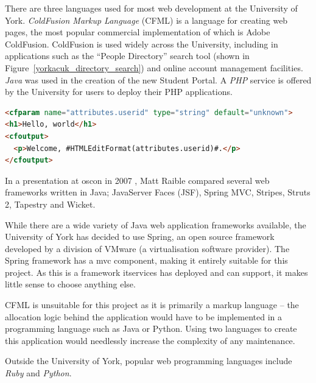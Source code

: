 \documentclass[draft]{scrartcl}
\begin{document}
There are three languages used for most web development at the University of
York. \emph{ColdFusion Markup Language} (CFML) is a language for creating web pages,
the most popular commercial implementation of which is Adobe ColdFusion.
ColdFusion is used widely across the University, including in applications
such as the ``People Directory'' search tool (shown in
Figure~\ref{yorkacuk_directory_search}) and online account management
facilities. \emph{Java} was used in the creation of the new Student Portal. A
\emph{PHP} service is offered by the University for users to deploy their PHP
applications.

\begin{lstlisting}[language=HTML]
<cfparam name="attributes.userid" type="string" default="unknown">
<h1>Hello, world</h1>
<cfoutput>
  <p>Welcome, #HTMLEditFormat(attributes.userid)#.</p>
</cfoutput>
\end{lstlisting}

In a presentation at \gls{oscon} in 2007 \cite{raible2007javawebframeworks},
Matt Raible compared several web frameworks written in Java; JavaServer Faces
(JSF), Spring MVC, Stripes, Struts 2, Tapestry and Wicket.

While there are a wide variety of Java web application frameworks available,
the University of York has decided to use Spring, an open source framework
developed by a division of VMware (a virtualisation software provider). The
Spring framework has a \gls{mvc} component, making it entirely suitable for
this project. As this is a framework \gls{itservices} has deployed and can
support, it makes little sense to choose anything else.

CFML is unsuitable for this project as it is primarily a markup language -- the
allocation logic behind the application would have to be implemented in a
programming language such as Java or Python. Using two languages to create
this application would needlessly increase the complexity of any maintenance.


Outside the University of York, popular web programming languages include
\emph{Ruby} and \emph{Python}.

% 
% 
\end{document}
